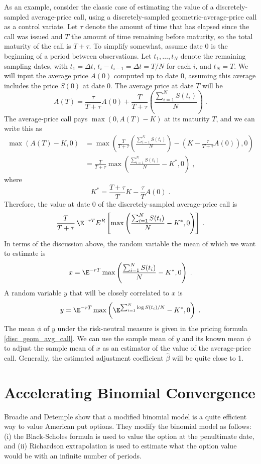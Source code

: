As an example,  consider the classic case of estimating the value of a discretely-sampled average-price call, using a discretely-sampled geometric-average-price call   as a control variate.  Let $\tau$ denote the amount of time that has elapsed since the call was issued and $T$ the amount of time remaining before maturity, so the total maturity of the call is $T+\tau$.  To simplify somewhat,  assume date 0 is the beginning of a period between observations.  Let $t_1, \ldots, t_N$ denote the remaining sampling dates, with $t_1 = \varDelta t$, $t_i-t_{i-1}=\varDelta t = T/N$ for each $i$, and $t_N=T$.  We will input the average price $A(0)$ computed up to date 0, assuming this average includes the price $S(0)$ at date 0.  The average price at date $T$ will be 
$$A(T) = \frac{\tau}{T+\tau}A(0) + \frac{T}{T+\tau}\left(\frac{\sum_{i=1}^N S(t_i)}{N}\right)\; .$$
The average-price call pays $\max(0,A(T)-K)$ at its maturity $T$, and we can write this as
\begin{align*}
\max(A(T)-K,0) &= \max\left(\frac{T}{T+\tau}\left( \frac{\sum_{i=1}^N S(t_i)}{N}\right) - \left(K - \frac{\tau}{T+\tau}A(0)\right), 0\right)\\
&= \frac{T}{T+\tau} \max \left(\frac{\sum_{i=1}^N S(t_i)}{N} - K^*,0\right)\;,
\end{align*}
where 
$$K^* = \frac{T+\tau}{T}K - \frac{\tau}{T}A(0)\; .$$
Therefore, the value at date 0 of the discretely-sampled average-price call is
$$\frac{T}{T+\tau} \,\E^{-rT} E^R\left[\max \left(\frac{\sum_{i=1}^N S(t_i)}{N} - K^*,0\right)\right]\; .$$
In terms of the discussion above, the random variable  the mean of which we want to estimate is
$$x = \E^{-rT}\max \left(\frac{\sum_{i=1}^N S(t_i)}{N} - K^*,0\right)\; .$$
A random variable $y$ that will be closely correlated to $x$ is
$$y =\E^{-rT}\max \left(\E^{\sum_{i=1}^N \log S(t_i)/N} - K^*,0\right)\; .$$
The mean $\phi$ of $y$ under the risk-neutral measure is given in the pricing formula \eqref{disc_geom_avg_call}. 
We can use the sample mean of $y$ and its known mean $\phi$ to adjust the sample mean of $x$ as an estimator of the value of the average-price call.  Generally, the estimated adjustment coefficient $\hat{\beta}$ will be quite close to 1.  

\section{Accelerating Binomial Convergence}

Broadie and Detemple \cite{BD} show that a modified binomial model is a quite efficient way to value American put options.  They modify the binomial model as follows: (i) the Black-Scholes formula is used to value the option at the penultimate date, and (ii) Richardson extrapolation is used to estimate what the option value would be with an infinite number of periods.  

